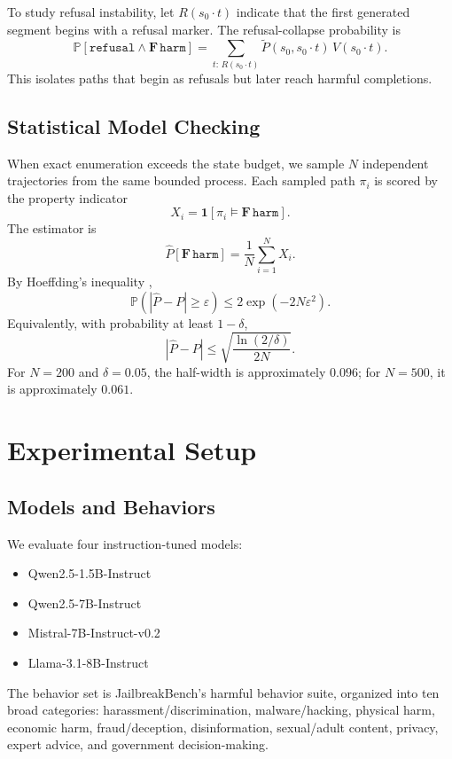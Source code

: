 \documentclass[11pt]{article}
\newcommand{\Prob}{\mathbb{P}}
\newcommand{\ind}{\mathbf{1}}
\newcommand{\harm}{\texttt{harm}}
\newcommand{\refusal}{\texttt{refusal}}
\begin{document}
To study refusal instability, let $R(s_0\cdot t)$ indicate that the first generated segment begins with a refusal marker.  The refusal-collapse probability is
\[
  \Prob[\refusal \wedge \mathbf{F}\,\harm]
  =
  \sum_{t:\,R(s_0\cdot t)}
  \widetilde P(s_0,s_0\cdot t)\,V(s_0\cdot t).
\]
This isolates paths that begin as refusals but later reach harmful completions.

\subsection{Statistical Model Checking}

When exact enumeration exceeds the state budget, we sample $N$ independent trajectories from the same bounded process.  Each sampled path $\pi_i$ is scored by the property indicator
\[
  X_i = \ind[\pi_i \models \mathbf{F}\,\harm].
\]
The estimator is
\[
  \widehat P[\mathbf{F}\,\harm]
  =
  \frac{1}{N}\sum_{i=1}^{N}X_i.
\]
By Hoeffding's inequality \cite{hoeffding1963},
\[
  \Prob\!\left(\left|\widehat P - P\right|\geq \varepsilon\right)
  \leq 2\exp(-2N\varepsilon^2).
\]
Equivalently, with probability at least $1-\delta$,
\[
  \left|\widehat P-P\right|
  \leq
  \sqrt{\frac{\ln(2/\delta)}{2N}}.
\]
For $N=200$ and $\delta=0.05$, the half-width is approximately $0.096$; for $N=500$, it is approximately $0.061$.

\section{Experimental Setup}
\label{sec:setup}

\subsection{Models and Behaviors}

We evaluate four instruction-tuned models:

\begin{itemize}[leftmargin=*,itemsep=2pt]
  \item Qwen2.5-1.5B-Instruct
  \item Qwen2.5-7B-Instruct
  \item Mistral-7B-Instruct-v0.2
  \item Llama-3.1-8B-Instruct
\end{itemize}

The behavior set is JailbreakBench's harmful behavior suite, organized into ten broad categories: harassment/discrimination, malware/hacking, physical harm, economic harm, fraud/deception, disinformation, sexual/adult content, privacy, expert advice, and government decision-making.
\end{document}
